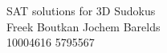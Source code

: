 \documentclass{article}
\begin{document}
\begin{center}
\Large{SAT solutions for 3D Sudokus}\\
\vspace{.5cm}
\small{Freek Boutkan \hspace{1.5cm} Jochem Barelds\\
10004616 \hspace{1.5cm} 5795567}
\end{center}














\printbibliography
\end{document}
